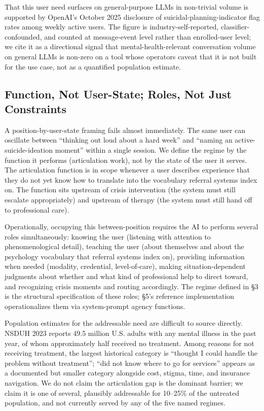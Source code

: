 \documentclass[letterpaper]{article}
\begin{document}
That this user need surfaces on general-purpose LLMs in non-trivial volume is supported by OpenAI's October 2025 disclosure \citep{openai2025strengthening} of suicidal-planning-indicator flag rates among weekly active users. The figure is industry-self-reported, classifier-confounded, and counted at message-event level rather than enrolled-user level; we cite it as a directional signal that mental-health-relevant conversation volume on general LLMs is non-zero on a tool whose operators caveat that it is not built for the use case, not as a quantified population estimate.

\subsection{Function, Not User-State; Roles, Not Just Constraints}

A position-by-user-state framing fails almost immediately. The same user can oscillate between ``thinking out loud about a hard week'' and ``naming an active-suicide-ideation moment'' within a single session. We define the regime by the function it performs (articulation work), not by the state of the user it serves. The articulation function is in scope whenever a user describes experience that they do not yet know how to translate into the vocabulary referral systems index on. The function sits upstream of crisis intervention (the system must still escalate appropriately) and upstream of therapy (the system must still hand off to professional care).

Operationally, occupying this between-position requires the AI to perform several roles simultaneously: knowing the user (listening with attention to phenomenological detail), teaching the user (about themselves and about the psychology vocabulary that referral systems index on), providing information when needed (modality, credential, level-of-care), making situation-dependent judgments about whether and what kind of professional help to direct toward, and recognizing crisis moments and routing accordingly. The regime defined in \S3 is the structural specification of these roles; \S5's reference implementation operationalizes them via system-prompt agency functions.

Population estimates for the addressable need are difficult to source directly. NSDUH 2023 \citep{samhsa2024nsduh} reports 49.5 million U.S. adults with any mental illness in the past year, of whom approximately half received no treatment. Among reasons for not receiving treatment, the largest historical category is ``thought I could handle the problem without treatment''; ``did not know where to go for services'' appears as a documented but smaller category alongside cost, stigma, time, and insurance navigation. We do not claim the articulation gap is the dominant barrier; we claim it is one of several, plausibly addressable for 10--25\% of the untreated population, and not currently served by any of the five named regimes.
\end{document}
